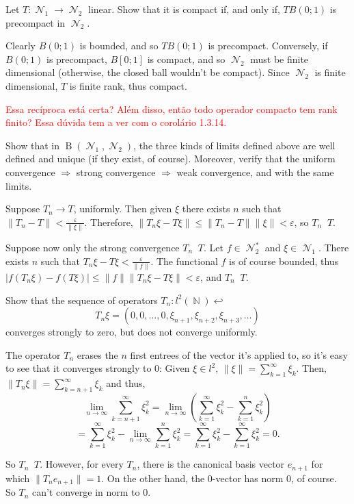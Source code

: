 \documentclass{article}
\theoremstyle{exercisestyle}
\newenvironment{exercise}[1]
  {\renewcommand\theinnerex{#1}\innerex}
  {\endinnerex}
\DeclareMathOperator{\bounded}{B}
\DeclareMathOperator{\Natural}{\mathbb{N}}
\DeclareMathOperator{\normed}{\mathcal{N}}
\DeclareMathOperator{\strongly}{\stackrel{s}{\longrightarrow}}
\DeclareMathOperator{\weakly}{\stackrel{w}{\longrightarrow}}
\newcommand{\norm}[1]{\lVert #1 \rVert}
\newcommand{\openball}[2]{B\left(#1;#2\right)}
\newcommand{\ball}[2]{\openball{#1}{#2}}
\newcommand{\closedball}[2]{B\left[#1;#2\right]}
\begin{document}
\begin{exercise}{1.3.12}
    Let $T : \normed_1 \to \normed_2$ linear. Show that it is compact if, and only if, $T \ball{0}{1}$ is precompact in $\normed_2$.

    Clearly $\ball{0}{1}$ is bounded, and so $T \ball{0}{1}$ is precompact. Conversely, if $\ball{0}{1}$ is precompact, $\closedball{0}{1}$ is compact, and so $\normed_2$
    must be finite dimensional (otherwise, the closed ball wouldn't be compact). Since $\normed_2$ is finite dimensional, $T$ is finite rank, thus compact.

    \textcolor{red}{Essa recíproca está certa? Além disso, então todo operador compacto tem rank finito? Essa dúvida tem a ver com o corolário 1.3.14.}


\end{exercise}

\begin{exercise}{1.3.16}
    Show that in $\bounded(\normed_1 , \normed_2 )$, the three kinds of limits defined above
    are well defined and unique (if they exist, of course). Moreover, verify that the
    uniform convergence $\Rightarrow$ strong convergence $\Rightarrow$ weak convergence, and with the
    same limits.

    Suppose $T_n \to T$, uniformly. Then given $\xi$ there exists $n$ such that $\norm{T_n - T} < \frac{\varepsilon}{\norm{\xi}}$.
    Therefore, $\norm{T_n \xi - T \xi} \leq \norm{T_n - T}\norm{\xi} < \varepsilon$, so $T_n \strongly T$.

    Suppose now only the strong convergence $T_n \strongly T$. Let $f \in \normed_2^*$ and $\xi \in \normed_1$. There exists $n$ such that $T_n \xi - T \xi < \frac{\varepsilon}{\norm{f}}$.
    The functional $f$ is of course bounded, thus $|f(T_n \xi) - f(T \xi)| \leq \norm{f} \norm{T_n \xi - T \xi} < \varepsilon$, and $T_n \weakly T$.

\end{exercise}

\begin{exercise}{1.3.18}
    Show that the sequence of operators $T_n : l^2 (\Natural) \hookleftarrow$
    $$ T_n \xi = \left(0, 0, \dots, 0, \xi_{n+1} , \xi_{n+2} , \xi_{n+3}, \dots \right)$$
    converges strongly to zero, but does not converge uniformly.


    The operator $T_n$ erases the $n$ first entrees of the vector it's applied to, so it's easy to see that it converges strongly to 0: Given $\xi \in l^2$, $\norm{\xi} = \sum_{k=1}^\infty \xi_k$. Then, $\norm{T_n \xi} = \sum_{k=n+1}^\infty \xi_k$ and thus,
    $$\lim_{n\to\infty} \sum_{k=n+1}^\infty \xi_k^2 = \lim_{n\to\infty} \left(\sum_{k=1}^\infty \xi_k^2 - \sum_{k=1}^{n} \xi_k^2 \right)$$
    $$ = \sum_{k=1}^\infty \xi_k^2 - \lim_{n\to\infty}\sum_{k=1}^{n} \xi_k^2= \sum_{k=1}^\infty \xi_k^2 - \sum_{k=1}^\infty \xi_k^2 = 0.$$

    So $T_n \strongly T$. However, for every $T_n$, there is the canonical basis vector $e_{n+1}$ for which $\norm{T_n e_{n+1}} = 1$. On the other hand, the 0-vector   has norm $0$, of course.
    So $T_n$ can't converge in norm to $0$.

\end{exercise}
\end{document}
